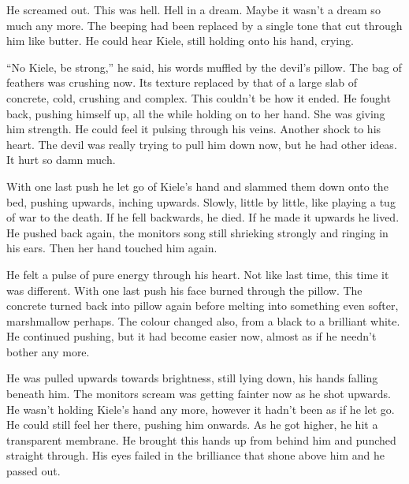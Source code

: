 He screamed out.  This was hell.  Hell in a dream.  Maybe it wasn't a dream so much any more.  The beeping had been replaced by a single tone that cut through him like butter.  He could hear Kiele, still holding onto his hand, crying.  

``No Kiele, be strong,'' he said, his words muffled by the devil's pillow.  The bag of feathers was crushing now.  Its texture replaced by that of a large slab of concrete, cold, crushing and complex.  This couldn't be how it ended.  He fought back, pushing himself up, all the while holding on to her hand.  She was giving him strength.  He could feel it pulsing through his veins.  Another shock to his heart.  The devil was really trying to pull him down now, but he had other ideas.  It hurt so damn much.  

With one last push he let go of Kiele's hand and slammed them down onto the bed, pushing upwards, inching upwards.  Slowly, little by little, like playing a tug of war to the death.  If he fell backwards, he died.  If he made it upwards he lived.  He pushed back again, the monitors song still shrieking strongly and ringing in his ears.  Then her hand touched him again.  

He felt a pulse of pure energy through his heart.  Not like last time, this time it was different.  With one last push his face burned through the pillow.  The concrete turned back into pillow again before melting into something even softer, marshmallow perhaps.  The colour changed also, from a black to a brilliant white.  He continued pushing, but it had become easier now, almost as if he needn't bother any more.  

He was pulled upwards towards brightness, still lying down, his hands falling beneath him.  The monitors scream was getting fainter now as he shot upwards.  He wasn't holding Kiele's hand any more, however it hadn't been as if he let go.  He could still feel her there, pushing him onwards.  As he got higher, he hit a transparent membrane.  He brought this hands up from behind him and punched straight through.  His eyes failed in the brilliance that shone above him and he passed out.





